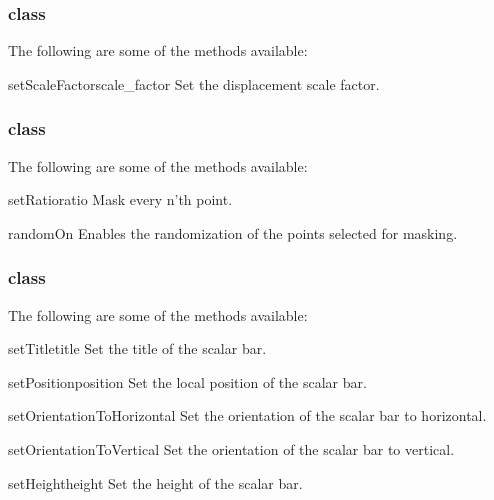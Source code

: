 \subsubsection{\Warp class}

The following are some of the methods available:

\begin{methoddesc}[Warp]{setScaleFactor}{scale_factor}
Set the displacement scale factor.
\end{methoddesc}

\subsubsection{\MaskPoints class}

The following are some of the methods available:

\begin{methoddesc}[MaskPoints]{setRatio}{ratio}
Mask every n'th point.
\end{methoddesc}

\begin{methoddesc}[MaskPoints]{randomOn}{}
Enables the randomization of the points selected for masking.
\end{methoddesc}


\subsubsection{\ScalarBar class}

The following are some of the methods available:

\begin{methoddesc}[ScalarBar]{setTitle}{title}
Set the title of the scalar bar.
\end{methoddesc}

\begin{methoddesc}[ScalarBar]{setPosition}{position}
Set the local position of the scalar bar.
\end{methoddesc}

\begin{methoddesc}[ScalarBar]{setOrientationToHorizontal}{}
Set the orientation of the scalar bar to horizontal.
\end{methoddesc}

\begin{methoddesc}[ScalarBar]{setOrientationToVertical}{}
Set the orientation of the scalar bar to vertical.
\end{methoddesc}

\begin{methoddesc}[ScalarBar]{setHeight}{height}
Set the height of the scalar bar.
\end{methoddesc}


